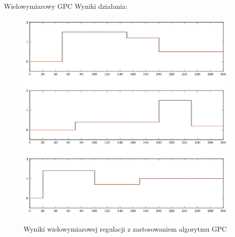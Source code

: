 \begin{frame}{Wielowymiarowy GPC}
Wyniki działania:
	\begin{center}
		\begin{figure}[H]
            		\includegraphics[scale=0.4]{images/wyniki_DMC.png} %
          			 \caption{Wyniki wielowymiarowej regulacji z zastosowaniem algorytmu GPC}
		\end{figure}
	\end{center}
\end{frame}
